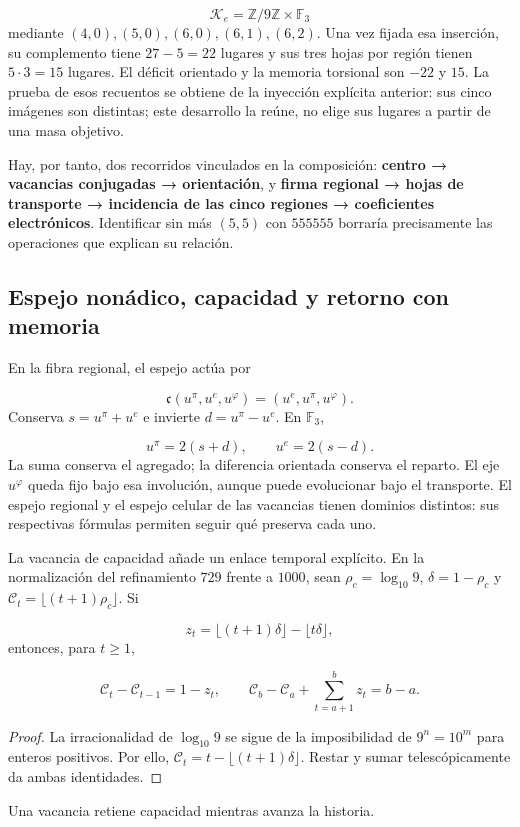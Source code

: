 \[
\mathcal K_e=\mathbb Z/9\mathbb Z\times\mathbb F_3
\]
mediante \((4,0),(5,0),(6,0),(6,1),(6,2)\). Una vez fijada esa inserción, su complemento tiene \(27-5=22\) lugares y sus tres hojas por región tienen \(5\cdot3=15\) lugares. El déficit orientado y la memoria torsional son \(-22\) y \(15\). La prueba de esos recuentos se obtiene de la inyección explícita anterior: sus cinco imágenes son distintas; este desarrollo la reúne, no elige sus lugares a partir de una masa objetivo.

Hay, por tanto, dos recorridos vinculados en la composición: \textbf{centro → vacancias conjugadas → orientación}, y \textbf{firma regional → hojas de transporte → incidencia de las cinco regiones → coeficientes electrónicos}. Identificar sin más \((5,5)\) con \(555555\) borraría precisamente las operaciones que explican su relación.

\subsection{Espejo nonádico, capacidad y retorno con memoria}
En la fibra regional, el espejo actúa por

\[
\mathfrak c(u^\pi,u^e,u^\varphi)=(u^e,u^\pi,u^\varphi).
\]
Conserva \(s=u^\pi+u^e\) e invierte \(d=u^\pi-u^e\). En \(\mathbb F_3\),

\[
u^\pi=2(s+d),\qquad u^e=2(s-d).
\]
La suma conserva el agregado; la diferencia orientada conserva el reparto. El eje \(u^\varphi\) queda fijo bajo esa involución, aunque puede evolucionar bajo el transporte. El espejo regional y el espejo celular de las vacancias tienen dominios distintos: sus respectivas fórmulas permiten seguir qué preserva cada uno.

La vacancia de capacidad añade un enlace temporal explícito. En la normalización del refinamiento \(729\) frente a \(1000\), sean \(\rho_c=\log_{10}9\), \(\delta=1-\rho_c\) y \(\mathcal C_t=\lfloor(t+1)\rho_c\rfloor\). Si

\[
z_t=\lfloor(t+1)\delta\rfloor-\lfloor t\delta\rfloor,
\]
entonces, para \(t\geq1\),

\[
\mathcal C_t-\mathcal C_{t-1}=1-z_t,
\qquad
\mathcal C_b-\mathcal C_a+\sum_{t=a+1}^b z_t=b-a.
\]
\begin{proof}
La irracionalidad de \(\log_{10}9\) se sigue de la imposibilidad de \(9^n=10^m\) para enteros positivos. Por ello, \(\mathcal C_t=t-\lfloor(t+1)\delta\rfloor\). Restar y sumar telescópicamente da ambas identidades. \end{proof}
Una vacancia retiene capacidad mientras avanza la historia.

